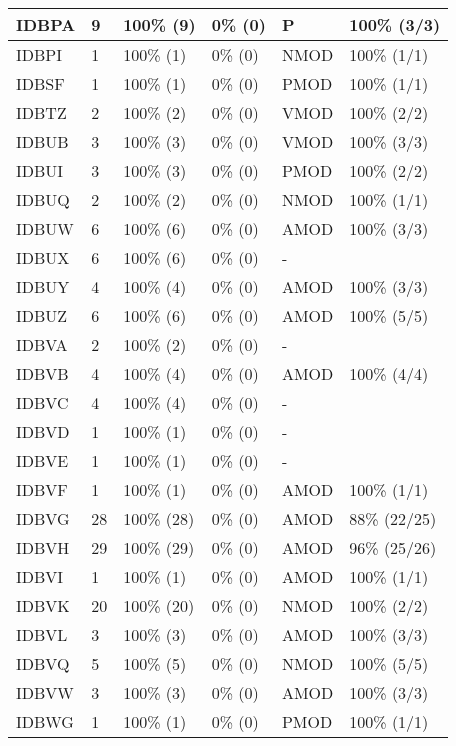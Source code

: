 \begin{figure*}
\begin{tabular}{|l|l|l|l||l|l|}
\hline
 IDBPA & 9 & 100\% (9) & 0\% (0) & P & 100\% (3/3) \\ 
\hline
 IDBPI & 1 & 100\% (1) & 0\% (0) & NMOD & 100\% (1/1) \\ 
\hline
 IDBSF & 1 & 100\% (1) & 0\% (0) & PMOD & 100\% (1/1) \\ 
\hline
 IDBTZ & 2 & 100\% (2) & 0\% (0) & VMOD & 100\% (2/2) \\ 
\hline
 IDBUB & 3 & 100\% (3) & 0\% (0) & VMOD & 100\% (3/3) \\ 
\hline
 IDBUI & 3 & 100\% (3) & 0\% (0) & PMOD & 100\% (2/2) \\ 
\hline
 IDBUQ & 2 & 100\% (2) & 0\% (0) & NMOD & 100\% (1/1) \\ 
\hline
 IDBUW & 6 & 100\% (6) & 0\% (0) & AMOD & 100\% (3/3) \\ 
\hline
 IDBUX & 6 & 100\% (6) & 0\% (0) & - &  \\ 
\hline
 IDBUY & 4 & 100\% (4) & 0\% (0) & AMOD & 100\% (3/3) \\ 
\hline
 IDBUZ & 6 & 100\% (6) & 0\% (0) & AMOD & 100\% (5/5) \\ 
\hline
 IDBVA & 2 & 100\% (2) & 0\% (0) & - &  \\ 
\hline
 IDBVB & 4 & 100\% (4) & 0\% (0) & AMOD & 100\% (4/4) \\ 
\hline
 IDBVC & 4 & 100\% (4) & 0\% (0) & - &  \\ 
\hline
 IDBVD & 1 & 100\% (1) & 0\% (0) & - &  \\ 
\hline
 IDBVE & 1 & 100\% (1) & 0\% (0) & - &  \\ 
\hline
 IDBVF & 1 & 100\% (1) & 0\% (0) & AMOD & 100\% (1/1) \\ 
\hline
 IDBVG & 28 & 100\% (28) & 0\% (0) & AMOD & 88\% (22/25) \\ 
\hline
 IDBVH & 29 & 100\% (29) & 0\% (0) & AMOD & 96\% (25/26) \\ 
\hline
 IDBVI & 1 & 100\% (1) & 0\% (0) & AMOD & 100\% (1/1) \\ 
\hline
 IDBVK & 20 & 100\% (20) & 0\% (0) & NMOD & 100\% (2/2) \\ 
\hline
 IDBVL & 3 & 100\% (3) & 0\% (0) & AMOD & 100\% (3/3) \\ 
\hline
 IDBVQ & 5 & 100\% (5) & 0\% (0) & NMOD & 100\% (5/5) \\ 
\hline
 IDBVW & 3 & 100\% (3) & 0\% (0) & AMOD & 100\% (3/3) \\ 
\hline
 IDBWG & 1 & 100\% (1) & 0\% (0) & PMOD & 100\% (1/1) \\ 
\hline
\end{tabular}
\end{figure*}

